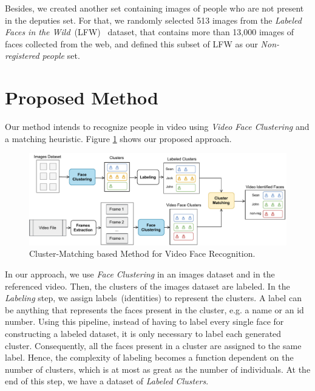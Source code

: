 Besides, we created another set containing images of people who are not present in the deputies set.
For that, we randomly selected 513 images from the \emph{Labeled Faces in the Wild}~(LFW)~\cite{LFWTech} dataset, that contains more than 13,000 images of faces collected from the web, and defined this subset of LFW as our \emph{Non-registered people} set.

\section{Proposed Method}
\label{sec:recognition_method}

Our method intends to recognize people in video using \emph{Video Face Clustering} and a matching heuristic.
Figure \ref{fig:cluster_matching} shows our proposed approach.

\begin{figure}[!ht]
    \centering
    \includegraphics[width=\textwidth]{img/face_recognition/cluster_matching_process.pdf}
    \caption{Cluster-Matching based Method for Video Face Recognition.}
    \label{fig:cluster_matching}
\end{figure}

In our approach, we use \emph{Face Clustering} in an images dataset and in the referenced video. Then, the clusters of the images dataset are labeled. 
In the \textit{Labeling} step, we assign labels~(identities) to represent the clusters.
A label can be anything that represents the faces present in the cluster, e.g. a name or an id number. 
Using this pipeline, instead of having to label every single face for constructing a labeled dataset, it is only necessary to label each generated cluster.
Consequently, all the faces present in a cluster are assigned to the same label. 
Hence, the complexity of labeling becomes a function dependent on the number of clusters, which is at most as great as the number of individuals.
At the end of this step, we have a dataset of \emph{Labeled Clusters}.


